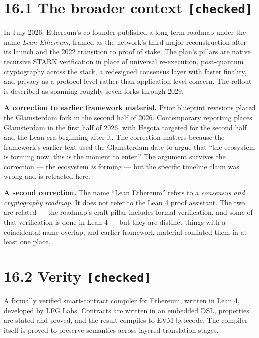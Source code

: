 \documentclass[
  11pt]{report}
\begin{document}
\hypertarget{the-broader-context-checked}{%
\section{\texorpdfstring{16.1 The broader context
\texttt{{[}checked{]}}}{16.1 The broader context {[}checked{]}}}\label{the-broader-context-checked}}

In July 2026, Ethereum's co-founder published a long-term roadmap under
the name \emph{Lean Ethereum}, framed as the network's third major
reconstruction after its launch and the 2022 transition to proof of
stake. The plan's pillars are native recursive STARK verification in
place of universal re-execution, post-quantum cryptography across the
stack, a redesigned consensus layer with faster finality, and privacy as
a protocol-level rather than application-level concern. The rollout is
described as spanning roughly seven forks through 2029.

\textbf{A correction to earlier framework material.} Prior blueprint
revisions placed the Glamsterdam fork in the second half of 2026.
Contemporary reporting places Glamsterdam in the first half of 2026,
with Hegota targeted for the second half and the Lean era beginning
after it. The correction matters because the framework's earlier text
used the Glamsterdam date to argue that ``the ecosystem is forming now,
this is the moment to enter.'' The argument survives the correction ---
the ecosystem \emph{is} forming --- but the specific timeline claim was
wrong and is retracted here.

\textbf{A second correction.} The name ``Lean Ethereum'' refers to a
\emph{consensus and cryptography roadmap}. It does not refer to the Lean
4 proof assistant. The two are related --- the roadmap's craft pillar
includes formal verification, and some of that verification is done in
Lean 4 --- but they are distinct things with a coincidental name
overlap, and earlier framework material conflated them in at least one
place.

\hypertarget{verity-checked}{%
\section{\texorpdfstring{16.2 Verity
\texttt{{[}checked{]}}}{16.2 Verity {[}checked{]}}}\label{verity-checked}}

A formally verified smart-contract compiler for Ethereum, written in
Lean 4, developed by LFG Labs. Contracts are written in an embedded DSL,
properties are stated and proved, and the result compiles to EVM
bytecode. The compiler itself is proved to preserve semantics across
layered translation stages.
\end{document}
